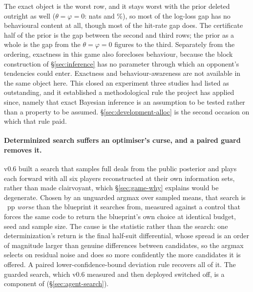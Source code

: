 The exact object is the worst row, and it stays worst with the prior deleted outright as well
($\theta = \varphi = 0$: \vsevenBeliefPriorlessNLL{} nats and \vsevenBeliefPriorlessHit\%), so
most of the log-loss gap has no behavioural content at all, though most of the hit-rate gap does. The certificate half of the prior is the gap
between the second and third rows; the prior as a whole is the gap from the
$\theta = \varphi = 0$ figures to the third. Separately from the ordering, exactness in this game also forecloses
behaviour, because the block construction of
\S\ref{sec:inference} has no parameter through which an opponent's tendencies could enter. Exactness
and behaviour-awareness are not available in the same object here. This closed an experiment three
studies had listed as outstanding, and it established a methodological rule the project has applied
since, namely that exact Bayesian inference is an assumption to be tested rather than a property to
be assumed. \S\ref{sec:development-alloc} is the second occasion on which that rule paid.

\paragraph{Determinized search suffers an optimiser's curse, and a paired guard removes it.} v0.6
built a search that samples full deals from the public posterior and plays each forward with all six
players reconstructed at their own information sets, rather than made clairvoyant, which
\S\ref{sec:game-why} explains would be degenerate. Chosen by an unguarded argmax over sampled means,
that search is \vsixCurseGap{}~pp \emph{worse} than the blueprint it searches from, measured against a
control that forces the same code to return the blueprint's own choice at identical budget, seed and
sample size. The cause is the statistic rather than the search: one determinization's return is the
final half-suit differential, whose spread is an order of magnitude larger than genuine differences
between candidates, so the argmax selects on residual noise and does so more confidently the more
candidates it is offered. A paired lower-confidence-bound deviation rule recovers all of it. The
guarded search, which v0.6 measured and then deployed switched off, is a component of \sestina{}
(\S\ref{sec:agent-search}).

